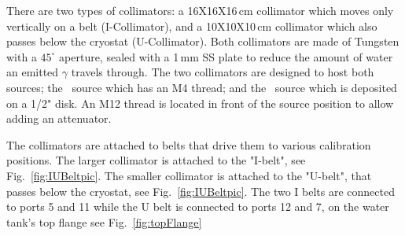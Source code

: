 \begin{figure}
\begin{minipage}[c]{0.4\textwidth}
    \end{minipage} 
    \label{fig:Colimator}
\end{figure}

There are two types of collimators: a 16X16X16\,cm collimator which moves only vertically on a belt (I-Collimator), and a 10X10X10\,cm collimator which also passes below the cryostat (U-Collimator). 
Both collimators are made of Tungsten with a $45^{\circ}$ aperture, sealed with a 1\,mm SS plate to reduce the amount of water an emitted $\gamma$ travels through. 
The two collimators are designed to host both sources; the \Th\ source which has an M4 thread; and the \Cs\ source which is deposited on a 1/2" disk. An M12 thread is located in front of the source position to allow adding an attenuator.
 
The collimators are attached to belts that drive them to various calibration positions. The larger collimator is attached to the "I-belt", see Fig.~\ref{fig:IUBeltpic}. The smaller collimator is attached to the "U-belt", that passes below the cryostat, see Fig.~\ref{fig:IUBeltpic}. The two I belts are connected to ports 5 and 11 while the U belt is connected to ports 12 and 7, on the water tank's top flange see Fig.~\ref{fig:topFlange} 


